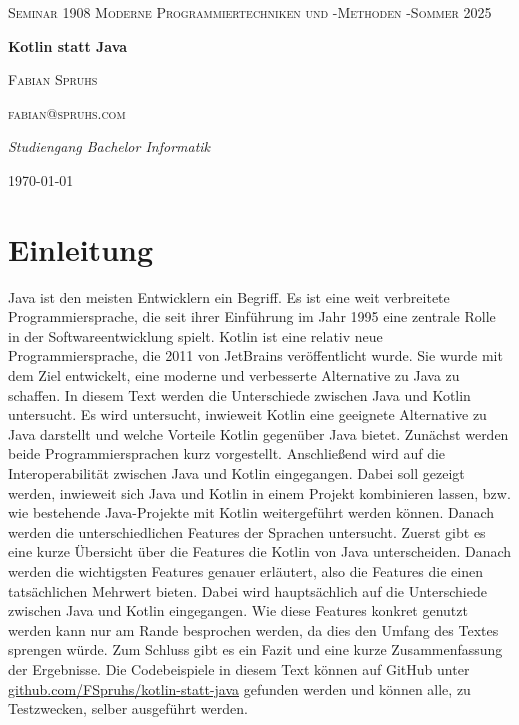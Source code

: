 \documentclass[11pt]{article}
\begin{document}
    \begin{titlepage}
        \centering
        {\scshape\LARGE Seminar 1908 Moderne Programmiertechniken und -Methoden -Sommer 2025 \par}
        \vspace{1cm}
        {\huge\bfseries Kotlin statt Java\par}
        \vspace{1.5cm}
        {\scshape\Large Fabian Spruhs\par}
        {\scshape fabian@spruhs.com\par}
        \vspace{2cm}
        {\Large\itshape Studiengang Bachelor Informatik\par}
        \vspace{2cm}


        {\large \today\par}
    \end{titlepage}

    \tableofcontents
    \newpage


    \section{Einleitung}
    Java ist den meisten Entwicklern ein Begriff.
    Es ist eine weit verbreitete Programmiersprache, die seit ihrer Einführung im Jahr 1995 eine zentrale Rolle in der Softwareentwicklung spielt.
    Kotlin ist eine relativ neue Programmiersprache, die 2011 von JetBrains veröffentlicht wurde.
    Sie wurde mit dem Ziel entwickelt, eine moderne und verbesserte Alternative zu Java zu schaffen.
    In diesem Text werden die Unterschiede zwischen Java und Kotlin untersucht.
    Es wird untersucht, inwieweit Kotlin eine geeignete Alternative zu Java darstellt und welche Vorteile Kotlin gegenüber Java bietet.
    Zunächst werden beide Programmiersprachen kurz vorgestellt.
    Anschließend wird auf die Interoperabilität zwischen Java und Kotlin eingegangen.
    Dabei soll gezeigt werden, inwieweit sich Java und Kotlin in einem Projekt kombinieren lassen, bzw. wie bestehende Java-Projekte mit Kotlin weitergeführt werden können.
    Danach werden die unterschiedlichen Features der Sprachen untersucht.
    Zuerst gibt es eine kurze Übersicht über die Features die Kotlin von Java unterscheiden.
    Danach werden die wichtigsten Features genauer erläutert, also die Features die einen tatsächlichen Mehrwert bieten.
    Dabei wird hauptsächlich auf die Unterschiede zwischen Java und Kotlin eingegangen.
    Wie diese Features konkret genutzt werden kann nur am Rande besprochen werden, da dies den Umfang des Textes sprengen würde.
    Zum Schluss gibt es ein Fazit und eine kurze Zusammenfassung der Ergebnisse.
    Die Codebeispiele in diesem Text können auf GitHub unter \url{github.com/FSpruhs/kotlin-statt-java} gefunden werden und können alle, zu Testzwecken, selber ausgeführt werden.
\end{document}
